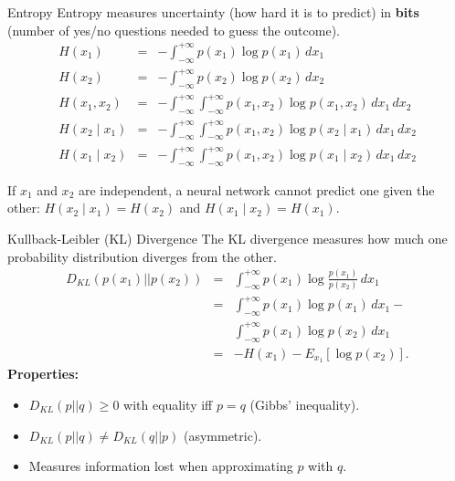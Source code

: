 \documentclass{beamer}
\begin{document}
\begin{frame}{Entropy}
  Entropy measures \alert{uncertainty} (how hard it is to predict) in
  \textbf{bits} (number of yes/no questions needed to guess the
  outcome).
\begin{eqnarray*}
H(x_1) &=& -\int_{-\infty}^{+\infty} p(x_1) \log p(x_1) \, dx_1 \\
H(x_2) &=& -\int_{-\infty}^{+\infty} p(x_2) \log p(x_2) \, dx_2 \\
H(x_1,x_2) &=& -\int_{-\infty}^{+\infty} \int_{-\infty}^{+\infty} p(x_1,x_2) \log p(x_1,x_2) \, dx_1 \, dx_2 \\
H(x_2\mid x_1) &=& -\int_{-\infty}^{+\infty} \int_{-\infty}^{+\infty} p(x_1,x_2) \log p(x_2\mid x_1) \, dx_1 \, dx_2 \\
H(x_1\mid x_2) &=& -\int_{-\infty}^{+\infty} \int_{-\infty}^{+\infty} p(x_1,x_2) \log p(x_1\mid x_2) \, dx_1 \, dx_2 
\end{eqnarray*}

If $x_1$ and $x_2$ are independent, a \alert{neural network} cannot predict
one given the other: $H(x_2\mid x_1)=H(x_2)$ and $H(x_1\mid
x_2)=H(x_1)$.
\end{frame}

\begin{frame}{Kullback-Leibler (KL) Divergence}
The KL divergence measures how much one probability distribution diverges from the other.
\begin{eqnarray*}
  D_{KL}(p(x_1)||p(x_2)) & = & \int_{-\infty}^{+\infty} p(x_1) \log\frac{p(x_1)}{p(x_2)} \, dx_1 \\
  & = &  \int_{-\infty}^{+\infty} p(x_1) \log p(x_1) \, dx_1 - \\
  &   & \int_{-\infty}^{+\infty} p(x_1) \log p(x_2) \, dx_1 \\
  & = & -H(x_1) - E_{x_1}[\log p(x_2)].
\end{eqnarray*}
\textbf{Properties:}
\begin{itemize}
\item $D_{KL}(p||q) \geq 0$ with equality iff $p = q$ (Gibbs' inequality).
\item $D_{KL}(p||q) \neq D_{KL}(q||p)$ (asymmetric).
\item Measures information lost when approximating $p$ with $q$.
\end{itemize}
\end{frame}
\end{document}
